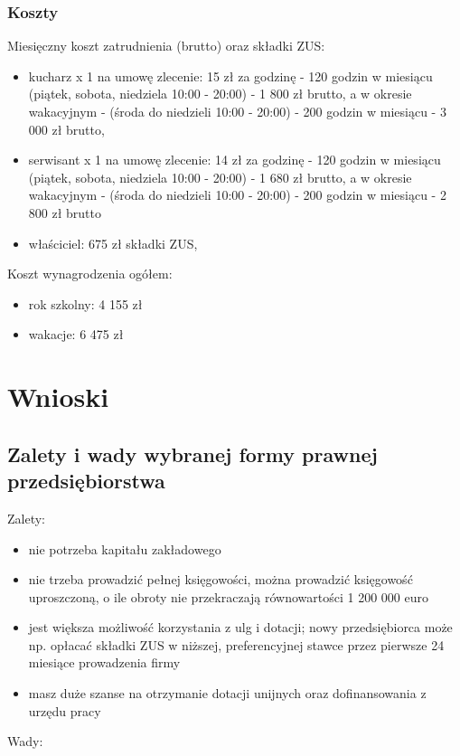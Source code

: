 \documentclass{sprawozdanie-agh}
\begin{document}
		\subsubsection{Koszty}
		Miesięczny koszt zatrudnienia (brutto) oraz składki ZUS:
		\begin{itemize}
			\item kucharz x 1 na umowę zlecenie: 15 zł za godzinę - 120 godzin w miesiącu (piątek, sobota, niedziela 10:00 - 20:00) - 1 800 zł brutto, a w okresie wakacyjnym - (środa do niedzieli 10:00 - 20:00) - 200 godzin w miesiącu - 3 000 zł brutto,
			\item serwisant x 1 na umowę zlecenie: 14 zł za godzinę - 120 godzin w miesiącu (piątek, sobota, niedziela 10:00 - 20:00) - 1 680 zł brutto, a w okresie wakacyjnym - (środa do niedzieli 10:00 - 20:00) - 200 godzin w miesiącu - 2 800 zł brutto
			\item właściciel: 675 zł składki ZUS,
		\end{itemize}
		Koszt wynagrodzenia ogółem:
		\begin{itemize}
			\item rok szkolny: 4 155 zł
			\item wakacje: 6 475 zł
		\end{itemize}

	\section{Wnioski} 

		\subsection{Zalety i wady wybranej formy prawnej przedsiębiorstwa}
 
		Zalety:

		\begin{itemize}
			\item nie potrzeba kapitału zakładowego
			\item nie trzeba prowadzić pełnej księgowości, można prowadzić księgowość uproszczoną, o ile obroty nie przekraczają równowartości 1 200 000 euro
			\item jest większa możliwość korzystania z ulg i dotacji; nowy przedsiębiorca może np. opłacać składki ZUS w niższej, preferencyjnej stawce przez pierwsze 24 miesiące prowadzenia firmy
			\item masz duże szanse na otrzymanie dotacji unijnych oraz dofinansowania z urzędu pracy
		\end{itemize}
		Wady:
\end{document}
